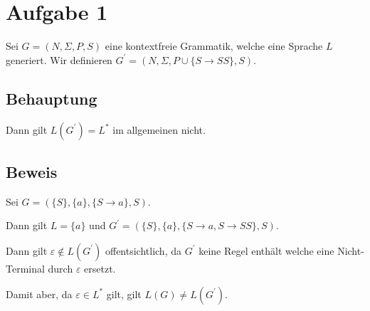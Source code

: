 \section*{Aufgabe 1}

Sei $G = (N, \Sigma, P, S)$ eine kontextfreie Grammatik, welche eine Sprache $L$ generiert. Wir definieren $G^{\prime} =
(N, \Sigma, P \cup \{ S \to SS \} , S)$. 

\subsection*{Behauptung}

Dann gilt $ L(G^{\prime}) = L^*$ im allgemeinen nicht.

\subsection*{Beweis}

Sei $G = (\{S\},\{a\},\{S \to a\},S)$.

Dann gilt
	 $L = \{a\}$ und
	 $G^{\prime} = (\{S\},\{a\},\{S\to a , S \to SS\},S)$.
	 
	 Dann gilt  $\varepsilon \notin L(G^\prime)$ offentsichtlich, da $G^\prime$ keine Regel enthält welche eine Nicht-Terminal durch $\varepsilon$ ersetzt.
	 
	 Damit aber, da $\varepsilon \in L^*$ gilt, gilt $L(G)\neq L(G^\prime)$.
	 
	 
	 